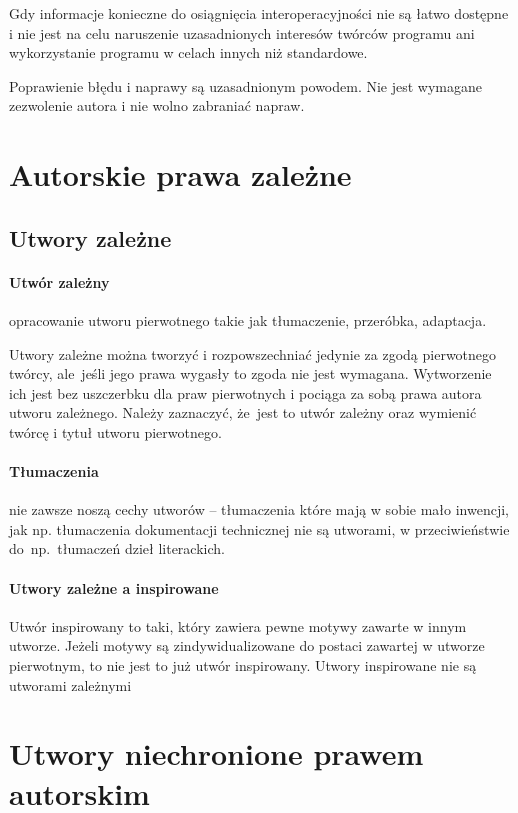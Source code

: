 \documentclass{article}
\begin{document}
Gdy informacje konieczne do osiągnięcia interoperacyjności nie są łatwo dostępne i nie jest na celu naruszenie uzasadnionych interesów twórców programu ani wykorzystanie programu w celach innych niż standardowe.

Poprawienie błędu i naprawy są uzasadnionym powodem.
Nie jest wymagane zezwolenie autora i nie wolno zabraniać napraw.


\section{Autorskie prawa zależne}

\subsection{Utwory zależne}

\paragraph{Utwór zależny}

opracowanie utworu pierwotnego takie jak tłumaczenie, przeróbka, adaptacja.

Utwory zależne można tworzyć i rozpowszechniać jedynie za zgodą pierwotnego twórcy, ale~jeśli jego prawa wygasły to zgoda nie jest wymagana.
Wytworzenie ich jest bez uszczerbku dla praw pierwotnych i pociąga za sobą prawa autora utworu zależnego.
Należy zaznaczyć, że~jest to utwór zależny oraz wymienić twórcę i tytuł utworu pierwotnego.


\paragraph{Tłumaczenia}

nie zawsze noszą cechy utworów -- tłumaczenia które mają w sobie mało inwencji,
jak np. tłumaczenia dokumentacji technicznej nie są utworami, w przeciwieństwie do~np.~tłumaczeń dzieł literackich.

\paragraph{Utwory zależne a inspirowane}

Utwór inspirowany to taki, który zawiera pewne motywy zawarte w innym utworze.
Jeżeli motywy są zindywidualizowane do postaci zawartej w utworze pierwotnym, to nie jest to już utwór inspirowany.
Utwory inspirowane nie są utworami zależnymi

\section{Utwory niechronione prawem autorskim}
\end{document}
